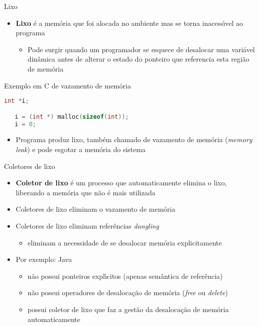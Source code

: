 \documentclass[handout,aspectratio=169]{beamer}
\newcommand{\bi}{\begin{itemize}[<+->]}
\newcommand{\ei}{\end{itemize}}
\begin{document}
\begin{frame}[fragile]{Lixo}

   \bi 
   \item \textbf{Lixo} \'{e} a mem\'{o}ria que foi alocada no ambiente mas se torna inacess\'{\i}vel ao programa
      \bi 
      \item Pode surgir quando um programador se esquece de desalocar uma vari\'{a}vel din\^{a}mica antes de alterar o estado do ponteiro que referencia esta regi\~{a}o de mem\'{o}ria
			\ei
   \ei

	\begin{block}{Exemplo em C de vazamento de mem\'{o}ria}
	\begin{lstlisting}[language=c++,numbers=none,basicstyle=\tiny]
   int *i;

   i = (int *) malloc(sizeof(int));
   i = 0;
   \end{lstlisting}
   \end{block}	

   \bi 
   \item Programa produz lixo, tamb\'{e}m chamado de vazamento de mem\'{o}ria (\textit{memory leak}) e pode esgotar a mem\'{o}ria do sistema
   \ei
\end{frame}

\begin{frame}{Coletores de lixo}

   \bi 
   \item \textbf{Coletor de lixo} \'{e} um processo que automaticamente elimina o lixo, liberando a mem\'{o}ria que n\~{a}o \'{e} mais utilizada
   \item Coletores de lixo eliminam o vazamento de mem\'{o}ria
   \item Coletores de lixo eliminam refer\^{e}ncias \textit{dangling}
      \bi 
      \item eliminam a necessidade de se desalocar mem\'{o}ria explicitamente
			\ei
   \item Por exemplo: Java
      \bi 
      \item n\~{a}o possui ponteiros expl\'{\i}citos (apenas sem\^{a}ntica de refer\^{e}ncia)
			\item n\~{a}o possui operadores de desaloca\c{c}\~{a}o de mem\'{o}ria (\textit{free} ou \textit{delete})
			\item possui coletor de lixo que faz a gest\~{a}o da desaloca\c{c}\~{a}o de mem\'{o}ria automaticamente
			\ei
   \ei
\end{frame}
\end{document}
